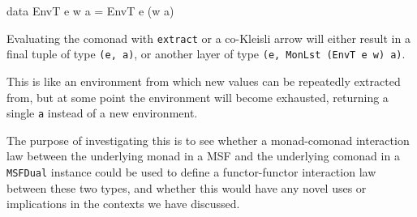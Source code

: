 \begin{haskell}
data EnvT e w a = EnvT e (w a)
\end{haskell}

Evaluating the comonad with \verb+extract+ or a co-Kleisli arrow will either result in a final tuple of type \verb+(e, a)+, or another layer of type \verb+(e, MonLst (EnvT e w) a)+.

This is like an environment from which new values can be repeatedly extracted from, but at some point the environment will become exhausted, returning a single \verb+a+ instead of a new environment.

The purpose of investigating this is to see whether a monad-comonad interaction law \cite{uustalu:2019} between the underlying monad in a MSF and the underlying comonad in a \verb+MSFDual+ instance could be used to define a functor-functor interaction law between these two types, and whether this would have any novel uses or implications in the contexts we have discussed.

